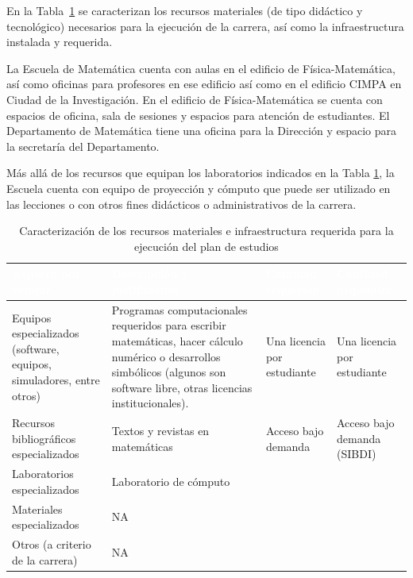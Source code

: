 En la Tabla~\ref{tab:recursos-materiales} se caracterizan los recursos materiales (de tipo didáctico y tecnológico) necesarios para la ejecución de la carrera, así como la infraestructura instalada y requerida.

La Escuela de Matemática cuenta con aulas en el edificio de Física-Matemática, así como oficinas para profesores en ese edificio así como en el edificio CIMPA en Ciudad de la Investigación. En el edificio de Física-Matemática se cuenta con espacios de oficina, sala de sesiones y espacios para atención de estudiantes. El Departamento de Matemática tiene una oficina para la Dirección y espacio para la secretaría del Departamento.

Más allá de los recursos que equipan los laboratorios indicados en la Tabla \ref{tab:recursos-materiales}, la Escuela cuenta con equipo de proyección y cómputo que puede ser utilizado en las lecciones o con otros fines didácticos o administrativos de la carrera.

\begin{table}[h!]
\centering
\small
\setlength{\tabcolsep}{4pt}%
\renewcommand{\arraystretch}{1.3}%
%
\caption{Caracterización de los recursos materiales e infraestructura requerida para la ejecución del plan de estudios}
\label{tab:recursos-materiales}
\begin{tabular}{|>{\raggedright\arraybackslash}p{4cm}|>{\raggedright\arraybackslash}p{6.4cm}|>{\centering\arraybackslash}p{1.9cm}|>{\centering\arraybackslash}p{1.9cm}|}
\hline
\rowcolor{Azul-UCR}
\textcolor{white}{\textbf{Aspecto por valorar}} & \textcolor{white}{\textbf{Descripción y justificación}} & \textcolor{white}{\textbf{Cantidad requerida}} & \textcolor{white}{\textbf{Cantidad disponible}} \\ \hline
Equipos especializados (software, equipos, simuladores, entre otros) & Programas computacionales requeridos para escribir matemáticas, hacer cálculo numérico o desarrollos simbólicos (algunos son software libre, otras licencias institucionales). & Una licencia por estudiante & Una licencia por estudiante  \\ \hline
Recursos bibliográficos especializados & Textos y revistas en matemáticas & Acceso bajo demanda & Acceso bajo demanda (SIBDI) \\ \hline
Laboratorios especializados & Laboratorio de cómputo & 2 & 2 \\ \hline
Materiales especializados & NA &  &  \\ \hline
Otros (a criterio de la carrera) & NA &  &  \\ \hline
\end{tabular}
%
\end{table}

